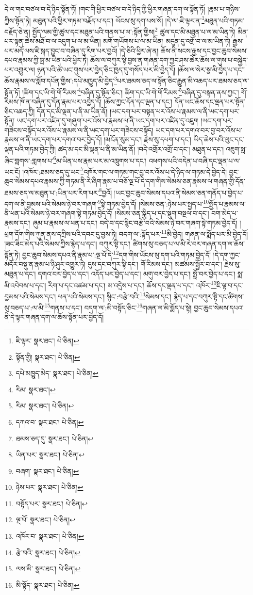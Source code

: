 དེ་ལ་གང་བཙལ་བ་དེ་ཉིད་སྟོན་ཏོ། །གང་གི་ཕྱིར་བཙལ་བ་དེ་ཉིད་ཀྱི་ཕྱིར་གཞན་དག་ལ་སྟོན་ཏོ། །རྣམ་པ་གཉིས་ཀྱིས་སྟོན་ཏེ། མཐུན་པའི་ཕྱིར་གཏམ་བརྗོད་པ་དང་། ཡོངས་སུ་དག་པས་སོ། །དེ་ལ་:ཇི་ལྟར་ན་\footnote{ཇི་ལྟར་  སྣར་ཐང་།  པེ་ཅིན། }མཐུན་པའི་གཏམ་བརྗོད་ཅེ་ན། སྤྱོད་ལམ་གྱི་ཚུལ་དང་མཐུན་པའི་གནས་པ་ལ་:སྟོན་གྱིས།\footnote{སྟོན་གྱི།  སྣར་ཐང་།  པེ་ཅིན། } ཚུལ་དང་མི་མཐུན་པ་ལ་མ་ཡིན་ཏེ། མིན་པར་སྟན་ཆེས་མཐོ་བ་ལ་འདུག་པ་ལ་མ་ཡིན། མགོ་གཡོགས་པ་ལ་མ་ཡིན། མདུན་དུ་འགྲོ་བ་ལ་མ་ཡིན་ཏེ། རྒྱས་པར་མདོ་ལས་ཇི་སྐད་བྱུང་བ་བཞིན་དུ་རིག་པར་བྱའོ། །དེ་ཅིའི་ཕྱིར་ཞེ་ན། ཆོས་ནི་སངས་རྒྱས་དང་བྱང་ཆུབ་སེམས་དཔའ་རྣམས་ཀྱི་བླ་མ་ཡིན་པའི་ཕྱིར་ཏེ། ཆོས་ལ་བཀུར་སྟི་བྱས་ན་གཞན་དག་ཀྱང་ཤས་ཆེར་ཆོས་ལ་གུས་པ་བསྐྱེད་པར་འགྱུར་ལ། ཉན་པའི་ཚེ་ཡང་གུས་པར་བྱེད་ཅིང་ཁྱད་དུ་གསོད་པར་མི་བྱེད་དོ། །ཆོས་ལ་སེར་སྣ་མི་བྱེད་པ་དང་། ཆོས་རྣམས་ལ་སློབ་དཔོན་གྱིས་:དཔེ་མཁྱུད་མི་བྱེད་\footnote{དཔེ་མཁྱུད་མེད་  སྣར་ཐང་།  པེ་ཅིན། }པར་ཐམས་ཅད་ལ་སྟོན་ཅིང་རྒྱུན་མི་འཆད་པར་ཐམས་ཅད་ལ་སྟོན་ཏོ། །ཚིག་དང་ཡི་གེ་གོ་རིམས་\footnote{རིམ་  སྣར་ཐང་། }བཞིན་དུ་སྟོན་ཅིང་། ཚིག་དང་ཡི་གེ་གོ་རིམས་\footnote{རིམ་  སྣར་ཐང་།  པེ་ཅིན། }བཞིན་དུ་བསྟན་ནས་ཀྱང་། གོ་རིམས་ཁོ་ན་བཞིན་དུ་དོན་རྣམ་པར་འབྱེད་དོ། །ཆོས་ཀྱང་དོན་དང་ལྡན་པ་དང་། དོན་ཡང་ཆོས་དང་ལྡན་པར་སྟོན་ཅིང་འཆད་ཀྱི། དོན་དང་མི་ལྡན་པ་ནི་མ་ཡིན་ནོ། །ཡང་དག་པར་བསྟན་པར་འོས་པ་རྣམས་ལ་ནི་ཡང་དག་པར་སྟོན། ཡང་དག་པར་འཛིན་དུ་གཞུག་པར་འོས་པ་རྣམས་ལ་ནི་ཡང་དག་པར་འཛིན་དུ་འཇུག །ཡང་དག་པར་གཟེངས་བསྟོད་པར་འོས་པ་རྣམས་ལ་ནི་ཡང་དག་པར་གཟེངས་བསྟོད། ཡང་དག་པར་དགའ་བར་བྱ་བར་འོས་པ་རྣམས་ལ་ནི་ཡང་དག་པར་དགའ་བར་བྱེད་དོ། །མངོན་སུམ་དང་། རྗེས་སུ་དཔག་པ་དང་། ཡིད་ཆེས་པའི་ལུང་དང་ལྡན་པའི་གཏམ་བྱེད་ཀྱི། ཚད་མ་དང་མི་ལྡན་པ་ནི་མ་ཡིན་ནོ། །བདེ་འགྲོར་འགྲོ་བ་དང་། མཐུན་པ་དང་། འཇུག་སླ་ཞིང་གླགས་:གླགས་པ་\footnote{དཀའ་བ་  སྣར་ཐང་།  པེ་ཅིན། }མ་ཡིན་པས་རྣམ་པར་མ་འཁྲུགས་པ་དང་། འཕགས་པའི་བདེན་པ་བཞི་དང་ལྡན་པ་ལ་ཡང་ངོ། །འཁོར་:ཐམས་ཅད་དུ་ཡང་\footnote{ཐམས་ཅད་དུ་  སྣར་ཐང་།  པེ་ཅིན། }འཁོར་གང་ལ་གཏམ་གང་བྱ་བར་འོས་པ་དེ་ཉིད་ལ་གཏམ་དེ་བྱེད་དེ། བྱང་ཆུབ་སེམས་དཔའ་རྣམས་ཀྱི་གཏམ་ནི་རེ་ཞིག་རྣམ་པ་བཅོ་ལྔ་པོ་དེ་དག་གིས་སེམས་ཅན་རྣམས་ལ་གཞན་གྱི་དོན་ཐམས་ཅད་ལ་མཐུན་པ་:ཡིན་པར་རིག་པར་\footnote{ཡིན་པར་  སྣར་ཐང་།  པེ་ཅིན། }བྱའོ། །ཡང་བྱང་ཆུབ་སེམས་དཔའ་ནི་སེམས་ཅན་གནོད་པ་བྱེད་པ་དག་ལ་ནི་བྱམས་པའི་སེམས་ཉེ་བར་གཞག་\footnote{བཞག་  སྣར་ཐང་།  པེ་ཅིན། }སྟེ་གཏམ་བྱེད་དོ། །སེམས་ཅན་:ཉེས་པར་སྤྱད་པ་\footnote{ཉེས་པར་  སྣར་ཐང་།  པེ་ཅིན། }སྤྱོད་པ་རྣམས་ལ་ནི་ཕན་པའི་སེམས་ཉེ་བར་གཞག་སྟེ་གཏམ་བྱེད་དོ། །སེམས་ཅན་སྐྱིད་པ་དང་སྡུག་བསྔལ་བ་དང་། བག་མེད་པ་རྣམས་དང་། ཞུམ་པ་རྣམས་ལ་ཕན་པ་དང་། བདེ་བ་དང་སྙིང་བརྩེ་བའི་སེམས་ཉེ་བར་གཞག་སྟེ་གཏམ་བྱེད་དོ། །ཕྲག་དོག་གིས་ཀུན་ནས་དཀྲིས་པའི་དབང་དུ་བྱས་ཏེ། བདག་ལ་:སྟོད་པར་\footnote{བསྟོད་པར་  སྣར་ཐང་།  པེ་ཅིན། }མི་བྱེད། གཞན་ལ་སྨོད་པར་མི་བྱེད་དོ། །ཟང་ཟིང་མེད་པའི་སེམས་ཀྱིས་རྙེད་པ་དང་། བཀུར་སྟི་དང་། ཚིགས་སུ་བཅད་པ་ལ་མི་རེ་བར་གཞན་དག་ལ་ཆོས་སྟོན་ཏེ། བྱང་ཆུབ་སེམས་དཔའ་ནི་རྣམ་པ་:ལྔ་པོ་དེ་\footnote{ལྔ་པོ་  སྣར་ཐང་།  པེ་ཅིན། }དག་གིས་ཡོངས་སུ་དག་པའི་གཏམ་བྱེད་དོ། །དེ་དག་ཀྱང་མདོར་བསྡུ་ན་རྣམ་པ་ཉི་ཤུར་འགྱུར་ཏེ། དུས་དང་བཀུར་སྟི་དང་། གོ་རིམས་དང་། མཚམས་སྦྱོར་བ་དང་། རྗེས་སུ་མཐུན་པ་དང་། དགའ་བར་བྱེད་པ་དང་། འདོད་པར་བྱེད་པ་དང་། མགུ་བར་བྱེད་པ་དང་། སྤྲོ་བར་བྱེད་པ་དང་། སྨ་མི་འབེབས་པ་དང་། རིག་པ་དང་འཚམ་པ་དང་། མ་འདྲེས་པ་དང་། ཆོས་དང་ལྡན་པ་དང་། འཁོར་\footnote{འཁོར་བ་  སྣར་ཐང་།  པེ་ཅིན། }ཇི་ལྟ་བ་དང་བྱམས་པའི་སེམས་དང་། ཕན་པའི་སེམས་དང་། སྙིང་:བརྩེ་བའི་\footnote{རྩེ་བའི་  སྣར་ཐང་།  པེ་ཅིན། }སེམས་དང་། རྙེད་པ་དང་བཀུར་སྟི་དང་ཚིགས་སུ་བཅད་པ་:ལ་མི་\footnote{ལས་མི་  སྣར་ཐང་།  པེ་ཅིན། }གནས་པ་དང་། བདག་ལ་:མི་བསྟོད་ཅིང་\footnote{མི་སྟོད་  སྣར་ཐང་།  པེ་ཅིན། }གཞན་ལ་མི་སྨོད་པ་སྟེ། བྱང་ཆུབ་སེམས་དཔའ་ནི་དེ་ལྟར་གཞན་དག་ལ་ཆོས་སྟོན་པར་བྱེད་དོ། 